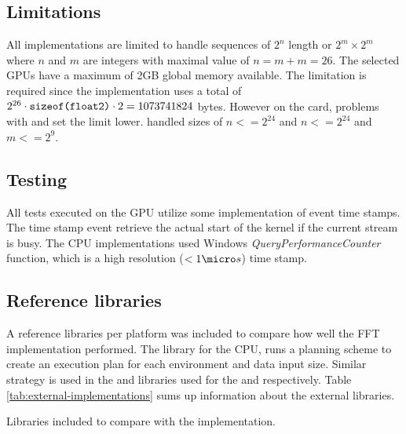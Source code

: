 \subsection{Limitations}

All implementations are limited to handle sequences of $2^n$ length or $2^m \times 2^m$ where $n$ and $m$ are integers with maximal value of $n = m + m = 26$. The selected \gls{GPU}s have a maximum of 2GB global memory available. The limitation is required since the implementation uses a total of $2^{26} \cdot \texttt{sizeof(float2)} \cdot 2 = 1073741824$ bytes. However on the {\AMDCARD} card, problems with {\DX} and {\GL} set the limit lower. {\DX} handled sizes of $n <= 2^{24}$ and {\GL} $n <= 2^{24}$ and $m <= 2^{9}$.

\subsection{Testing}

All tests executed on the \gls{GPU} utilize some implementation of event time stamps. The time stamp event retrieve the actual start of the kernel if the current stream is busy. The \gls{CPU} implementations used Windows \emph{QueryPerformanceCounter} function, which is a high resolution ($<1{\micro}s$) time stamp.

\subsection{Reference libraries}

A reference libraries per platform was included to compare how well the FFT implementation performed. The \emph{\FFTW} library for the \gls{CPU}, runs a planning scheme to create an execution plan for each environment and data input size. Similar strategy is used in the {\CUFFT} and {\CLFFT} libraries used for the {\NVCARD} and {\AMDCARD} respectively. Table \ref{tab:external-implementations} sums up information about the external libraries.

\begin{table}
	\centering
	
	\caption{Libraries included to compare with the implementation.}
	\label{tab:external-implementations}
\end{table}